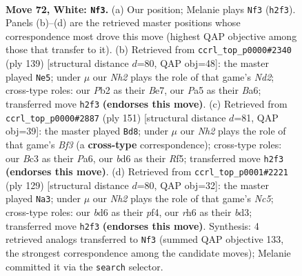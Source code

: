 \documentclass[11pt]{article}
\begin{document}
\clearpage

\begin{figure}[p]\centering
\begin{subfigure}{0.46\textwidth}\centering
\resizebox{\linewidth}{!}{%
\newchessgame
\chessboard[
  setfen={8/5kp1/p2b2rr/Pppb1p1p/2p2P1P/2B1P1P1/1P3K1N/2R3R1 w - - 16 72},
  showmover=false,
  pgfstyle=straightmove, color=movearrow, markmove={h2-f3}
]}
\caption{}
\end{subfigure}\hfill
\begin{subfigure}{0.46\textwidth}\centering
\resizebox{\linewidth}{!}{%
\newchessgame
\chessboard[
  setfen={5rr1/3nbp1k/b2p2pP/N1pP4/p3PB2/P5R1/1PB5/6RK b - - 0 70},
  showmover=false,
  pgfstyle=straightmove, color=movearrow, markmove={d7-e5}
]}
\caption{}
\end{subfigure}
\\[4pt]
\begin{subfigure}{0.46\textwidth}\centering
\resizebox{\linewidth}{!}{%
\newchessgame
\chessboard[
  setfen={8/1p1r4/p1p1kb2/P3prp1/1PP1R2p/1K3P1P/4R1P1/2B5 b - - 6 76},
  showmover=false,
  pgfstyle=straightmove, color=movearrow, markmove={f6-d8}
]}
\caption{}
\end{subfigure}\hfill
\begin{subfigure}{0.46\textwidth}\centering
\resizebox{\linewidth}{!}{%
\newchessgame
\chessboard[
  setfen={2r5/p3bkp1/Ppr1p1p1/5pP1/2nP1P1P/2PB1K2/4R3/1R2B3 b - - 44 65},
  showmover=false,
  pgfstyle=straightmove, color=movearrow, markmove={c4-a3}
]}
\caption{}
\end{subfigure}
\caption{\textbf{Move 72, White: \texttt{Nf3}.} (a) Our position; Melanie plays \texttt{Nf3} (\texttt{h2f3}). Panels (b)--(d) are the retrieved master positions whose correspondence most drove this move (highest QAP objective among those that transfer to it). (b) Retrieved from \texttt{ccrl\_top\_p0000\#2340} (ply 139) [structural distance $d$=80, QAP obj=48]: the master played \texttt{Ne5}; under $\mu$ our \emph{Nh2} plays the role of that game's \emph{Nd2}; cross-type roles: our \emph{P}b2 as their \emph{B}e7, our \emph{P}a5 as their \emph{B}a6; transferred move \texttt{h2f3} \textbf{(endorses this move)}. (c) Retrieved from \texttt{ccrl\_top\_p0000\#2887} (ply 151) [structural distance $d$=81, QAP obj=39]: the master played \texttt{Bd8}; under $\mu$ our \emph{Nh2} plays the role of that game's \emph{Bf3} (a \textbf{cross-type} correspondence); cross-type roles: our \emph{B}c3 as their \emph{P}a6, our \emph{b}d6 as their \emph{R}f5; transferred move \texttt{h2f3} \textbf{(endorses this move)}. (d) Retrieved from \texttt{ccrl\_top\_p0001\#2221} (ply 129) [structural distance $d$=80, QAP obj=32]: the master played \texttt{Na3}; under $\mu$ our \emph{Nh2} plays the role of that game's \emph{Nc5}; cross-type roles: our \emph{b}d6 as their \emph{p}f4, our \emph{r}h6 as their \emph{b}d3; transferred move \texttt{h2f3} \textbf{(endorses this move)}. Synthesis: 4 retrieved analogs transferred to \texttt{Nf3} (summed QAP objective 133, the strongest correspondence among the candidate moves); Melanie committed it via the \texttt{search} selector.}
\label{fig:thought-m142}
\end{figure}
\end{document}
